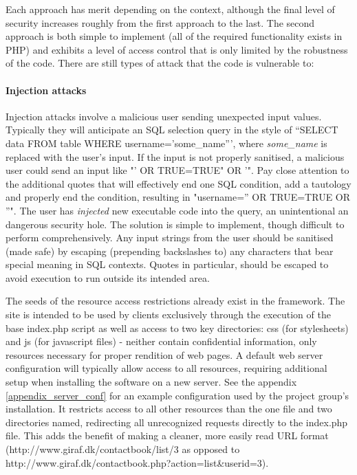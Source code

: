 Each approach has merit depending on the context, although the final level of security increases roughly from the first approach to the last. The second approach is both simple to implement (all of the required functionality exists in PHP) and exhibits a level of access control that is only limited by the robustness of the code. There are still types of attack that the code is vulnerable to:

\paragraph*{Injection attacks}
Injection attacks involve a malicious user sending unexpected input values. Typically they will anticipate an SQL selection query in the style of ``SELECT data FROM table WHERE username='some\_name''', where \emph{some\_name} is replaced with the user's input. If the input is not properly sanitised, a malicious user could send an input like "' OR TRUE=TRUE" OR '". Pay close attention to the additional quotes that will effectively end one SQL condition, add a tautology and properly end the condition, resulting in "username='' OR TRUE=TRUE OR ''". The user has \emph{injected} new executable code into the query, an unintentional an dangerous security hole. The solution is simple to implement, though difficult to perform comprehensively. Any input strings from the user should be sanitised (made safe) by escaping (prepending backslashes to) any characters that bear special meaning in SQL contexts. Quotes in particular, should be escaped to avoid execution to run outside its intended area.

The seeds of the resource access restrictions already exist in the framework. The site is intended to be used by clients exclusively through the execution of the base index.php script as well as access to two key directories: css (for stylesheets) and js (for javascript files) - neither contain confidential information, only resources necessary for proper rendition of web pages. A default web server configuration will typically allow access to all resources, requiring additional setup when installing the software on a new server. See the appendix \vref{appendix_server_conf} for an example configuration used by the project group's installation. It restricts access to all other resources than the one file and two directories named, redirecting all unrecognized requests directly to the index.php file. This adds the benefit of making a cleaner, more easily read URL format (http://www.giraf.dk/contactbook/list/3 as opposed to http://www.giraf.dk/contactbook.php?action=list\&userid=3).

